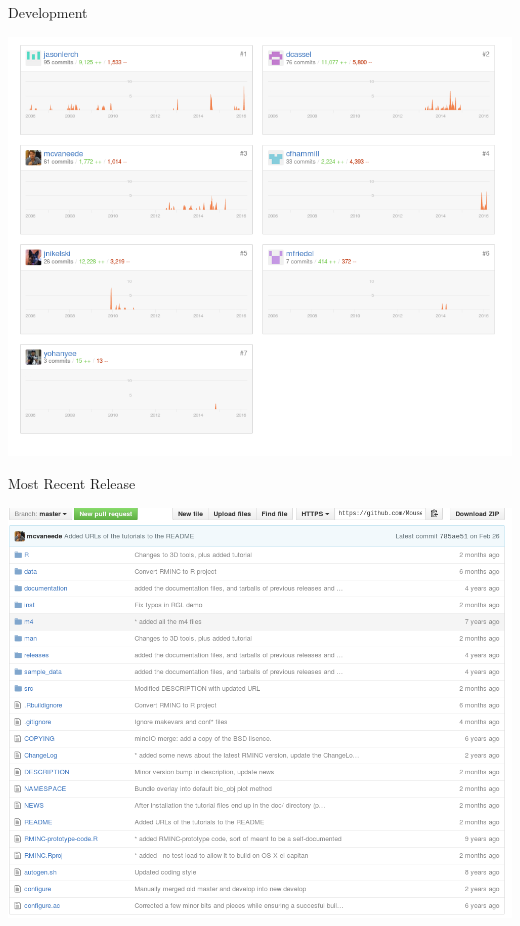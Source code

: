 \begin{frame}{Development}

\includegraphics{contributors.png}

\end{frame}

\begin{frame}{Most Recent Release}

\includegraphics{RMINC_recent_master.png}

\end{frame}

